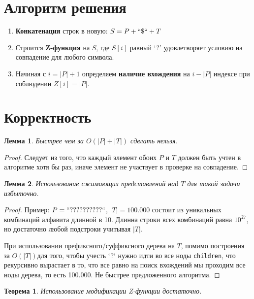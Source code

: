 \documentclass{article}
\newtheorem{lemma}{Лемма}  %
\newtheorem{theorem}{Теорема}  %
\begin{document}
\section{Алгоритм решения}

\begin{enumerate}
    \item \textbf{Конкатенация} строк в новую: $ S = P + ``\$`` + T $
    \item Строится \textbf{Z-функция} на $S$, где $S[i]$ равный `?' удовлетворяет условию на совпадение для любого символа.
    \item Начиная с $i=|P| + 1$ определяем \textbf{наличие вхождения} на $i-|P|$ индексе при соблюдении $Z[i]=|P|$.
\end{enumerate}

\section{Корректность}

\begin{lemma}
    Быстрее чем за $O(|P| + |T|)$ сделать нельзя.
\end{lemma}

\begin{proof}
    Следует из того, что каждый элемент обоих $P$ и $T$ должен быть учтен в алгоритме хотя бы раз, иначе элемент не участвует в проверке на совпадение.
\end{proof}

\begin{lemma}
    Использование сжимающих представлений над $T$ для такой задачи избыточно.
\end{lemma}

\begin{proof}
    Пример: $P=``??????????``$, $|T|=100.000$ состоит из уникальных комбинаций алфавита длинной в 10. Длинна строки всех комбинаций равна $10^{27}$, но достаточно любой подстроки учитывая $|T|$.

    При использовании префиксного/суффиксного дерева на $T$, помимо построения за $O(|T|)$для того, чтобы учесть `?` нужно идти во все ноды \texttt{children}, что рекурсивно вырастает в то, что все равно на поиск вхождений мы проходим все ноды дерева, то есть 100.000. Не быстрее предложенного алгоритма.
\end{proof}

\begin{theorem}
    Использование модификации Z-функции достаточно.
\end{theorem}
\end{document}
